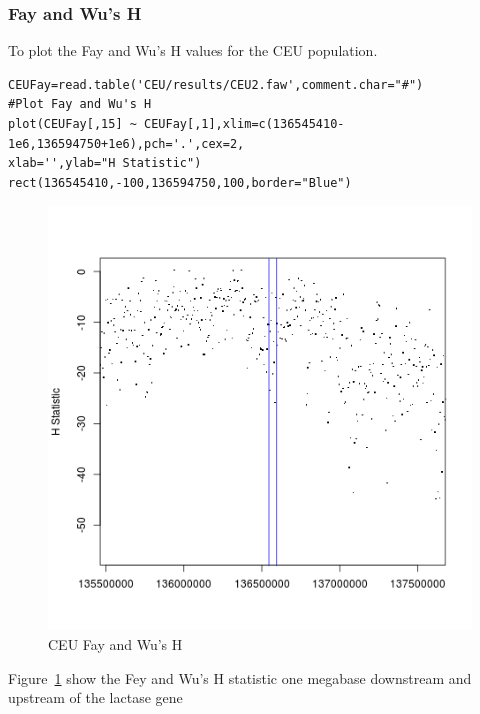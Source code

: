\documentclass[a4paper,10pt]{article}
\begin{document}
\subsubsection{Fay and Wu's H}
To plot the Fay and Wu's H values for the CEU population.\\
\begin{verbatim}
CEUFay=read.table('CEU/results/CEU2.faw',comment.char="#")
#Plot Fay and Wu's H
plot(CEUFay[,15] ~ CEUFay[,1],xlim=c(136545410-1e6,136594750+1e6),pch='.',cex=2,
xlab='',ylab="H Statistic")
rect(136545410,-100,136594750,100,border="Blue") 
\end{verbatim}
\begin{figure}
\centering
\includegraphics{pictures/CEUFay.png}
\caption{CEU Fay and Wu's H}
\label{fig:fayceu}
\end{figure}
Figure~\ref{fig:fayceu} show the Fey and Wu's H statistic one megabase downstream and upstream of the lactase gene
\end{document}
